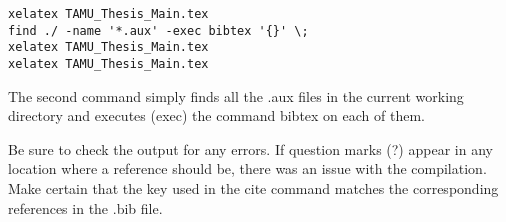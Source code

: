 {\footnotesize \begin{verbatim}
xelatex TAMU_Thesis_Main.tex
find ./ -name '*.aux' -exec bibtex '{}' \;
xelatex TAMU_Thesis_Main.tex
xelatex TAMU_Thesis_Main.tex
\end{verbatim}}
The second command simply finds all the .aux files in the current working directory and executes (exec) the command bibtex on each of them.

Be sure to check the output for any errors. If question marks (?) appear in any location where a reference should be, there was an issue with the compilation. Make certain that the key used in the cite command matches the corresponding references in the .bib file.